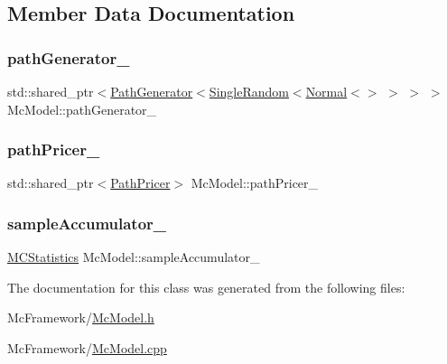 \subsection{Member Data Documentation}
\hypertarget{class_mc_model_a79918134182b5642b719bb9e78a5f2fc}{}\label{class_mc_model_a79918134182b5642b719bb9e78a5f2fc} 
\subsubsection{\texorpdfstring{path\+Generator\+\_\+}{pathGenerator\_}}
{\footnotesize\ttfamily std\+::shared\+\_\+ptr$<$\hyperlink{class_path_generator}{Path\+Generator}$<$\hyperlink{struct_single_random}{Single\+Random}$<$\hyperlink{class_normal}{Normal}$<$$>$ $>$ $>$ $>$ Mc\+Model\+::path\+Generator\+\_\+\hspace{0.3cm}{\ttfamily [private]}}

\hypertarget{class_mc_model_a8b4390b3abdd1ffdd121a09f141299f9}{}\label{class_mc_model_a8b4390b3abdd1ffdd121a09f141299f9} 
\subsubsection{\texorpdfstring{path\+Pricer\+\_\+}{pathPricer\_}}
{\footnotesize\ttfamily std\+::shared\+\_\+ptr$<$\hyperlink{class_path_pricer}{Path\+Pricer}$>$ Mc\+Model\+::path\+Pricer\+\_\+\hspace{0.3cm}{\ttfamily [private]}}

\hypertarget{class_mc_model_aec19a3ee01c95751a50360d264d51def}{}\label{class_mc_model_aec19a3ee01c95751a50360d264d51def} 
\subsubsection{\texorpdfstring{sample\+Accumulator\+\_\+}{sampleAccumulator\_}}
{\footnotesize\ttfamily \hyperlink{class_m_c_statistics}{M\+C\+Statistics} Mc\+Model\+::sample\+Accumulator\+\_\+\hspace{0.3cm}{\ttfamily [private]}}



The documentation for this class was generated from the following files\+:\begin{DoxyCompactItemize}
\item 
Mc\+Framework/\hyperlink{_mc_model_8h}{Mc\+Model.\+h}\item 
Mc\+Framework/\hyperlink{_mc_model_8cpp}{Mc\+Model.\+cpp}\end{DoxyCompactItemize}
